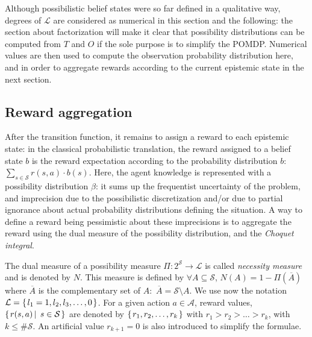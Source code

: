 Although possibilistic belief states were so far defined in 
a qualitative way, degrees 
of $\mathcal{L}$ are considered as numerical in this section and
the following: the section about factorization will make it clear that
possibility distributions can be computed from $T$ and $O$ if the
sole purpose is to simplify the POMDP.
Numerical values are then used to compute the observation probability distribution
here, and in order to aggregate rewards according to the current epistemic state 
in the next section.

\subsection{Reward aggregation}
\label{aggreg}
After the transition function, it remains to assign a reward to each epistemic state:
in the classical probabilistic translation, the reward assigned to a belief state $b$ is
the reward expectation according to the probability distribution $b$: $\sum_{s \in \mathcal{S}} r(s,a) \cdot b(s)$.
Here, the agent knowledge is represented with a possibility distribution $\beta$: 
it sums up the frequentist uncertainty of the problem, 
and imprecision due to the possibilistic discretization 
and/or due to partial ignorance about actual probability distributions
defining the situation.
A way to define a reward being pessimistic about these imprecisions is to aggregate the
reward using the dual measure of the possibility distribution, and the \textit{Choquet integral}.

The dual measure of a possibility measure $\Pi:2^{\mathcal{S}} \rightarrow \mathcal{L}$
is called \textit{necessity measure} and is denoted by $N$. This measure is defined
by $\forall A \subseteq \mathcal{S}$, $N(A) = 1 - \Pi(\overline{A})$ where $\overline{A}$
is the complementary set of $A:$ $\overline{A} = \mathcal{S} \setminus A $.
We use now the notation $\mathcal{L} = \left\{ \left.  l_1=1,l_2,l_3, \ldots, 0  \right. \right\}$.
For a given action $a \in \mathcal{A}$, reward values, 
$\left\{ \left.  r(s,a) \, \right| \left. \, s \in \mathcal{S}  \right. \right\}$ are denoted by
$\left\{ \left. r_1,r_2,\ldots,r_k \right. \right\}$ with $r_1 > r_2 > \ldots > r_k$, 
with $k \leqslant \# \mathcal{S}$. An artificial value $r_{k+1}=0$ is also
introduced to simplify the formulae.

